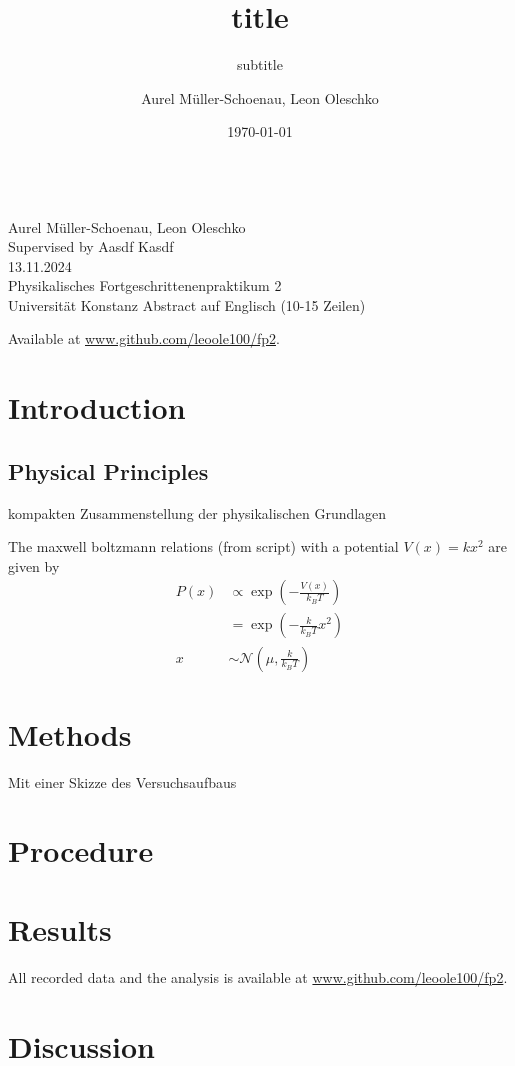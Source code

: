 \documentclass[
    parskip=half, 
    twoside=false,
    twocolumn=true,
    fontsize=11pt,
]{scrarticle}
\begin{document}
\title{title}
\subtitle{subtitle}
\author{Aurel Müller-Schoenau, Leon Oleschko}
\date{\dotdate\today}


\begin{titlepage}
    \sffamily
    \vspace*{3cm}
    {
        \fontsize{32}{32}
    }
    \vspace{.25cm}\\
    {
        \Large
        Aurel Müller-Schoenau, Leon Oleschko\\
        Supervised by Aasdf Kasdf
        \vspace{.05cm}\\
        13.11.2024
        \vspace{.25cm}\\
        \normalsize
        Physikalisches Fortgeschrittenenpraktikum 2\\
        Universität Konstanz
    }
    \vfill
    {
        \normalfont\normalsize
        Abstract auf Englisch (10-15 Zeilen)
        \blindtext[2]
    }
    \vfill
    \begin{flushright}
        Available at \url{www.github.com/leoole100/fp2}.
    \end{flushright}
\end{titlepage}

\section{Introduction}

\subsection{Physical Principles}
kompakten Zusammenstellung der physikalischen Grundlagen

The maxwell boltzmann relations (from script) with a potential $V(x) = k x^2$ are given by
\begin{align}
    P(x) &\propto \exp\left(- \frac{V(x)}{k_B T}\right)\\
    &= \exp\left(-\frac{k}{k_B T} x^2\right)\\
    x &\sim \mathcal{N}\left(\mu, \frac{k}{k_B T}\right)
\end{align}


\section{Methods}
Mit einer Skizze des Versuchsaufbaus

\section{Procedure}

\pagebreak
\section{Results}

All recorded data and the analysis is available at \url{www.github.com/leoole100/fp2}.

\pagebreak
\section{Discussion}
\end{document}
